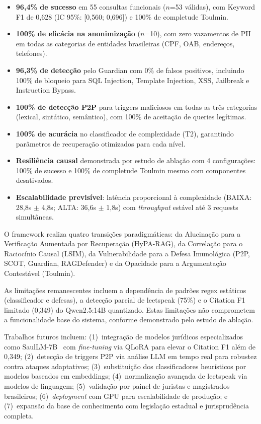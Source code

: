 \documentclass[journal,10pt]{IEEEtran}
\begin{document}
\begin{itemize}
    \item \textbf{96{,}4\% de sucesso} em 55 consultas funcionais ($n$=53 v\'{a}lidas), com Keyword F1 de 0{,}628 (IC 95\%: [0{,}560; 0{,}696]) e 100\% de completude Toulmin.
    \item \textbf{100\% de efic\'{a}cia na anonimiza\c{c}\~{a}o} ($n$=10), com zero vazamentos de PII em todas as categorias de entidades brasileiras (CPF, OAB, endere\c{c}os, telefones).
    \item \textbf{96{,}3\% de detec\c{c}\~{a}o} pelo Guardian com 0\% de falsos positivos, incluindo 100\% de bloqueio para SQL Injection, Template Injection, XSS, Jailbreak e Instruction Bypass.
    \item \textbf{100\% de detec\c{c}\~{a}o P2P} para triggers maliciosos em todas as tr\^{e}s categorias (lexical, sint\'{a}tico, sem\^{a}ntico), com 100\% de aceita\c{c}\~{a}o de queries leg\'{i}timas.
    \item \textbf{100\% de acur\'{a}cia} no classificador de complexidade (T2), garantindo par\^{a}metros de recupera\c{c}\~{a}o otimizados para cada n\'{i}vel.
    \item \textbf{Resili\^{e}ncia causal} demonstrada por estudo de abla\c{c}\~{a}o com 4 configura\c{c}\~{o}es: 100\% de sucesso e 100\% de completude Toulmin mesmo com componentes desativados.
    \item \textbf{Escalabilidade previs\'{i}vel}: lat\^{e}ncia proporcional \`{a} complexidade (BAIXA: 28{,}8s $\pm$ 4{,}8s; ALTA: 36{,}6s $\pm$ 1{,}8s) com \textit{throughput} est\'{a}vel at\'{e} 3 requests simult\^{a}neas.
\end{itemize}

O framework realiza quatro transi\c{c}\~{o}es paradigm\'{a}ticas: da Alucina\c{c}\~{a}o para a Verifica\c{c}\~{a}o Aumentada por Recupera\c{c}\~{a}o (HyPA-RAG), da Correla\c{c}\~{a}o para o Racioc\'{i}nio Causal (LSIM), da Vulnerabilidade para a Defesa Imunol\'{o}gica (P2P, SCOT, Guardian, RAGDefender) e da Opacidade para a Argumenta\c{c}\~{a}o Contest\'{a}vel (Toulmin).

As limita\c{c}\~{o}es remanescentes incluem a depend\^{e}ncia de padr\~{o}es regex est\'{a}ticos (classificador e defesas), a detec\c{c}\~{a}o parcial de leetspeak (75\%) e o Citation F1 limitado (0{,}349) do Qwen2.5:14B quantizado. Estas limita\c{c}\~{o}es n\~{a}o comprometem a funcionalidade base do sistema, conforme demonstrado pelo estudo de abla\c{c}\~{a}o.

Trabalhos futuros incluem: (1)~integra\c{c}\~{a}o de modelos jur\'{i}dicos especializados como SaulLM-7B~\cite{saullm2024a} com \textit{fine-tuning} via QLoRA para elevar o Citation F1 al\'{e}m de 0{,}349; (2)~detec\c{c}\~{a}o de triggers P2P via an\'{a}lise LLM em tempo real para robustez contra ataques adaptativos; (3)~substitui\c{c}\~{a}o dos classificadores heur\'{i}sticos por modelos baseados em embeddings; (4)~normaliza\c{c}\~{a}o avan\c{c}ada de leetspeak via modelos de linguagem; (5)~valida\c{c}\~{a}o por painel de juristas e magistrados brasileiros; (6)~\textit{deployment} com GPU para escalabilidade de produ\c{c}\~{a}o; e (7)~expans\~{a}o da base de conhecimento com legisla\c{c}\~{a}o estadual e jurisprud\^{e}ncia completa.
\end{document}
